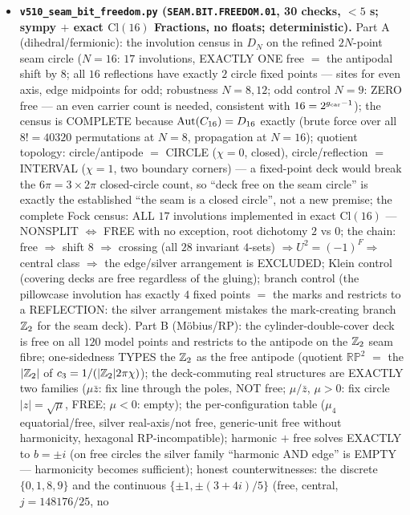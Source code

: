 \begin{itemize}[leftmargin=1.5em]
\item \textbf{\texttt{v510\_seam\_bit\_freedom.py} (\texttt{SEAM.BIT.FREEDOM.01}, 30 checks, $<5$ s;
sympy $+$ exact $\mathrm{Cl}(16)$ Fractions, no floats; deterministic).} Part A (dihedral/fermionic):
the involution census in $D_N$ on the refined $2N$-point seam circle ($N=16$: $17$ involutions,
EXACTLY ONE free $=$ the antipodal shift by $8$; all $16$ reflections have exactly $2$ circle fixed
points --- sites for even axis, edge midpoints for odd; robustness $N=8,12$; odd control $N=9$: ZERO
free --- an even carrier count is needed, consistent with $16=2^{g_{\mathrm{car}}-1}$); the census is COMPLETE
because $\operatorname{Aut}(C_{16})=D_{16}$ exactly (brute force over all $8!=40320$ permutations at $N=8$,
propagation at $N=16$); quotient topology: circle/antipode $=$ CIRCLE ($\chi=0$, closed),
circle/reflection $=$ INTERVAL ($\chi=1$, two boundary corners) --- a fixed-point deck would break
the $6\pi=3\times2\pi$ closed-circle count, so ``deck free on the seam circle'' is exactly the
established ``the seam is a closed circle'', not a new premise; the complete Fock census: ALL $17$
involutions implemented in exact $\mathrm{Cl}(16)$ --- NONSPLIT $\iff$ FREE with no exception, root
dichotomy $2$ vs $0$; the chain: free $\Rightarrow$ shift $8$ $\Rightarrow$ crossing (all $28$
invariant $4$-sets) $\Rightarrow U^2=(-1)^F\Rightarrow$ central class $\Rightarrow$ the edge/silver
arrangement is EXCLUDED; Klein control (covering decks are free regardless of the gluing); branch
control (the pillowcase involution has exactly $4$ fixed points $=$ the marks and restricts to a
REFLECTION: the silver arrangement mistakes the mark-creating branch $\mathbb{Z}_2$ for the seam deck).
Part B (M\"obius/RP): the cylinder-double-cover deck is free on all $120$ model points and restricts
to the antipode on the $\mathbb{Z}_2$ seam fibre; one-sidedness TYPES the $\mathbb{Z}_2$ as the free antipode
(quotient $\mathbb{RP}^2$ $=$ the $|\mathbb{Z}_2|$ of $c_3=1/(|\mathbb{Z}_2|2\pi\chi)$); the deck-commuting real
structures are EXACTLY two families ($\mu\bar z$: fix line through the poles, NOT free; $\mu/\bar z$,
$\mu>0$: fix circle $|z|=\sqrt\mu$, FREE; $\mu<0$: empty); the per-configuration table ($\mu_4$
equatorial/free, silver real-axis/not free, generic-unit free without harmonicity, hexagonal
RP-incompatible); harmonic $+$ free solves EXACTLY to $b=\pm i$ (on free circles the silver family
``harmonic AND edge'' is EMPTY --- harmonicity becomes sufficient); honest counterwitnesses: the
discrete $\{0,1,8,9\}$ and the continuous $\{\pm1,\pm(3{+}4i)/5\}$ (free, central, $j=148176/25$, no

\end{itemize}
